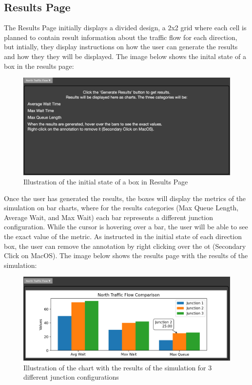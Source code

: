 \documentclass{article}
\begin{document}
    \subsection{Results Page}
        
        The Results Page initially displays a divided design, a 2x2 grid where each cell is planned to contain result information about the traffic flow for each direction, but intially,
        they display instructions on how the user can generate the results and how they they will be displayed. The image below shows the inital state of a box in the results page:

        \begin{figure}[H]
            \centering
            \includegraphics[width=\textwidth]{results1.png}
            \caption{Illustration of the initial state of a box in Results Page}
            \label{fig:results1}
        \end{figure}

        Once the user has generated the results, the boxes will display the metrics of the simulation on bar charts, where for the results categories (Max Queue Length, Average Wait, and Max Wait)
        each bar represents a different junction configuration. While the cursor is hovering over a bar, the user will be able to see the exact value of the metric. As instructed in the initial state 
        of each direction box, the user can remove the annotation by right clicking over the ot (Secondary Click on MacOS). The image below shows the results page with the results of the simulation:

        \begin{figure}[H]
            \centering
            \includegraphics[width=\textwidth]{results2.png}
            \caption{Illustration of the chart with the results of the simulation for 3 different junction configurations} 
            \label{fig:results2}
        \end{figure}
\end{document}
